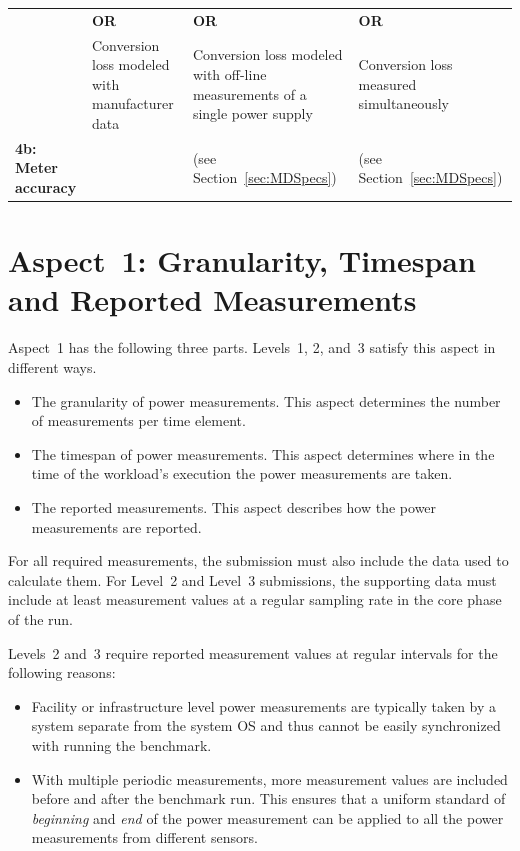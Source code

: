 \begin{table}
\begin{tabular}{|p{2.5cm}|p{3.5cm}|p{3.5cm}|p{3.5cm}|}
 &
\centering \textbf{OR} &
\centering \textbf{OR} &
\centering \textbf{OR} \tabularnewline

 &
Conversion loss modeled with manufacturer data &
Conversion loss modeled with off-line measurements of a single power supply &
Conversion loss measured simultaneously \\
\hline
\textbf{4b: Meter accuracy} &
\SpecAccuracyLOne{} &
\SpecAccuracyLTwo{} (see Section~\ref{sec:MDSpecs})&
\SpecAccuracyLThree{} (see Section~\ref{sec:MDSpecs})\\
\hline
\end{tabular}
\end{table}

\section{Aspect~1: Granularity, Timespan and Reported Measurements}
\label{sec:A1GTRM}

Aspect~1 has the following three parts.
Levels~1, 2, and~3 satisfy this aspect in different ways.

\begin{itemize}
\item
The granularity of power measurements.
This aspect determines the number of measurements per time element.
\item
The timespan of power measurements.
This aspect determines where in the time of the workload's execution the power measurements are taken.
\item
The reported measurements.
This aspect describes how the power measurements are reported.
\end{itemize}

For all required measurements, the submission must also include the data used to calculate them.
For Level~2 and Level~3 submissions, the supporting data must include at least \MinMeasurementsCorePhaseLTwoThree{} measurement values at a regular sampling rate in the core phase of the run.

Levels~2 and~3 require reported measurement values at regular intervals for the following reasons:

\begin{itemize}
\item
Facility or infrastructure level power measurements are typically taken by a system separate from the system OS and thus cannot be easily synchronized with running the benchmark.
\item
With multiple periodic measurements, more measurement values are included before and after the benchmark run.
This ensures that a uniform standard of \textit{beginning} and \textit{end} of the power measurement can be applied to all the power measurements from different sensors.
\end{itemize}

